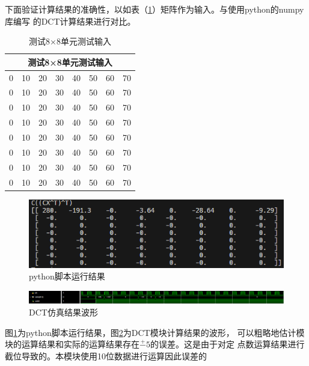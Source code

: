 \documentclass{article}
\numberwithin {equation}{section}
\begin{document}
\begin{spacing}{1.25}
        下面验证计算结果的准确性，以如表（\ref{testMatrix}）矩阵作为输入。与使用python的numpy库编写
        的DCT计算结果进行对比。
        \begin{table}[H]
          \caption{测试8×8单元测试输入}
          \label{testMatrix}
          \centering
          \begin{tabular}{cccccccc}
            \toprule
            \multicolumn{8}{c}{测试8×8单元测试输入}\\
            \midrule
            0 & 10 & 20 & 30 & 40 & 50 & 60 & 70 \\
            0 & 10 & 20 & 30 & 40 & 50 & 60 & 70 \\
            0 & 10 & 20 & 30 & 40 & 50 & 60 & 70 \\
            0 & 10 & 20 & 30 & 40 & 50 & 60 & 70 \\
            0 & 10 & 20 & 30 & 40 & 50 & 60 & 70 \\
            0 & 10 & 20 & 30 & 40 & 50 & 60 & 70 \\
            0 & 10 & 20 & 30 & 40 & 50 & 60 & 70 \\
            0 & 10 & 20 & 30 & 40 & 50 & 60 & 70 \\
            \bottomrule
          \end{tabular}
        \end{table}

        \begin{figure}[H]
          \centering
          \includegraphics[scale=0.8]{./pictures/python脚本运行结果.png}
          \caption{python脚本运行结果}
          \label{py result}
        \end{figure}
        \begin{figure}[H]
          \centering
          \includegraphics[scale=0.3725]{./pictures/DCTSimulationResult.png}
          \caption{ DCT仿真结果波形}
          \label{result simulation}
        \end{figure}

        图\ref{py result}为python脚本运行结果，图\ref{result simulation}为DCT模块计算结果的波形，
        可以粗略地估计模块的运算结果和实际的运算结果存在$\stackrel{+}{-}5$的误差。这是由于对定
        点数运算结果进行截位导致的。本模块使用10位数据进行运算因此误差的

\end{spacing}
\end{document}
